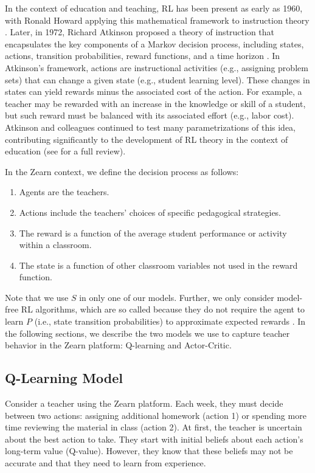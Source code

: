 \documentclass[
  number,
  preprint,
  3p,
  onecolumn]{elsarticle}
\begin{document}
In the context of education and teaching, RL has been present as early
as 1960, with Ronald Howard applying this mathematical framework to
instruction theory \citep{howard1960}. Later, in 1972, Richard Atkinson
proposed a theory of instruction that encapsulates the key components of
a Markov decision process, including states, actions, transition
probabilities, reward functions, and a time horizon
\citep{atkinson1972}. In Atkinson's framework, actions are instructional
activities (e.g., assigning problem sets) that can change a given state
(e.g., student learning level). These changes in states can yield
rewards minus the associated cost of the action. For example, a teacher
may be rewarded with an increase in the knowledge or skill of a student,
but such reward must be balanced with its associated effort (e.g., labor
cost). Atkinson and colleagues continued to test many parametrizations
of this idea, contributing significantly to the development of RL theory
in the context of education (see \citep{doroudi2019} for a full review).

In the Zearn context, we define the decision process as follows:

\begin{enumerate}
\def\labelenumi{\arabic{enumi}.}
\item
  Agents are the teachers.
\item
  Actions include the teachers' choices of specific pedagogical
  strategies.
\item
  The reward is a function of the average student performance or
  activity within a classroom.
\item
  The state is a function of other classroom variables not used in the
  reward function.
\end{enumerate}

Note that we use \(S\) in only one of our models. Further, we only
consider model-free RL algorithms, which are so called because they do
not require the agent to learn \(P\) (i.e., state transition
probabilities) to approximate expected rewards \citep{watkins1992}. In
the following sections, we describe the two models we use to capture
teacher behavior in the Zearn platform: Q-learning and Actor-Critic.

\subsection{Q-Learning Model}\label{q-learning-model}

Consider a teacher using the Zearn platform. Each week, they must decide
between two actions: assigning additional homework (action 1) or
spending more time reviewing the material in class (action 2). At first,
the teacher is uncertain about the best action to take. They start with
initial beliefs about each action's long-term value (Q-value). However,
they know that these beliefs may not be accurate and that they need to
learn from experience.
\end{document}

